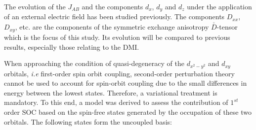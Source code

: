 \documentclass[12pt]{report}
\numberwithin{equation}{section}
\begin{document}
\begin{center}
\end{center}
The evolution of the $J_{AB}$ and the components $d_x$, $d_y$ and $d_z$ under the application of an external electric field has been studied previously.
The components $D_{xx}$, $D_{xy}$, etc. are the components of the symmetric exchange anisotropy $\overline{\overline{D}}$-tensor which is the focus of this study.
Its evolution will be compared to previous results, especially those relating to the DMI.

When approaching the condition of quasi-degeneracy of the $d_{x^2-y^2}$ and $d_{xy}$ orbitals, \textit{i.e} first-order spin orbit coupling, second-order perturbation theory cannot be used to account for spin-orbit coupling due to the small differences in energy between the lowest states.
Therefore, a variational treatment is mandatory.
To this end, a model was derived to assess the contribution of $1^{st}$ order SOC based on the spin-free states generated by the occupation of these two orbitals.
The following states form the uncoupled basis:
\end{document}
